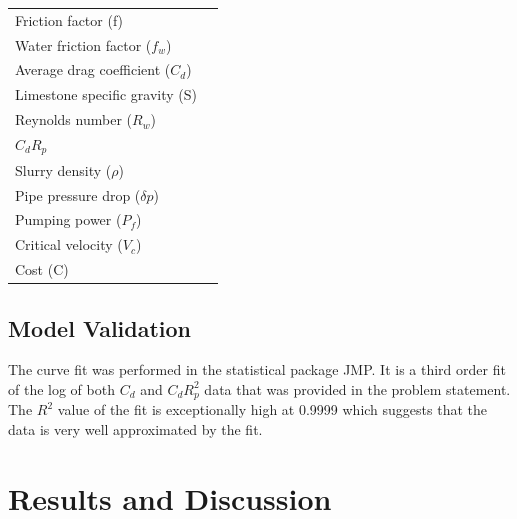 \documentclass{article}
\begin{document}
\begin{center}
\begin{tabular}{|l|l|}
		Friction factor (f)                      &                                          \\
		Water friction factor ($f_w$)            &                                          \\
		Average drag coefficient ($C_d$)         &                                          \\
		Limestone specific gravity (S)           &                                          \\
		Reynolds number ($R_w$)                  &                                          \\
		$C_dR_p$                                 &                                          \\
		Slurry density ($\rho$)                  &                                          \\
		Pipe pressure drop ($\delta p$)          &                                          \\
		Pumping power ($P_f$)                    &                                          \\
		Critical velocity ($V_c$)                &                                          \\
		Cost (C)                                 &                                          \\
		\hline
	\end{tabular}
\end{center}
\subsection{Model Validation}
The curve fit was performed in the statistical package JMP. It is a third order fit of the log of both $C_d$ and $C_dR_p^2$ data that was provided in the problem statement.  The $R^2$ value of the fit is exceptionally high at 0.9999 which suggests that the data is very well approximated by the fit.


\section{Results and Discussion}
\end{document}
